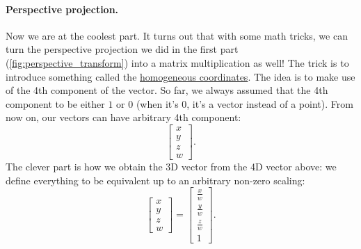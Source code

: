 \paragraph{Perspective projection.}
Now we are at the coolest part. It turns out that with some math tricks, we can turn the perspective projection we did in the first part (\cref{fig:perspective_transform}) into a matrix multiplication as well! The trick is to introduce something called the \href{https://en.wikipedia.org/wiki/Homogeneous_coordinates}{homogeneous coordinates}. The idea is to make use of the 4th component of the vector. So far, we always assumed that the 4th component to be either $1$ or $0$ (when it's $0$, it's a vector instead of a point). From now on, our vectors can have arbitrary 4th component:
\begin{equation}
\begin{bmatrix}
x \\
y \\
z \\
w
\end{bmatrix}.
\end{equation}
The clever part is how we obtain the 3D vector from the 4D vector above: we define everything to be equivalent up to an arbitrary non-zero scaling:
\begin{equation}
\begin{bmatrix}
x \\
y \\
z \\
w
\end{bmatrix} =
\begin{bmatrix}
\frac{x}{w} \\
\frac{y}{w} \\
\frac{z}{w} \\
1
\end{bmatrix}.
\end{equation}

